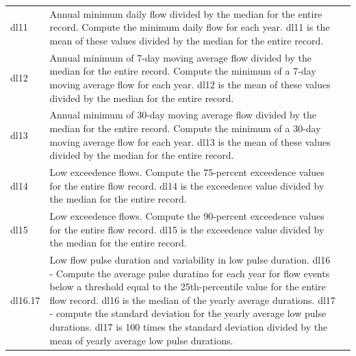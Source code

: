 \documentclass[a4paper,11pt]{article}\usepackage[]{graphicx}\usepackage[]{color}
\begin{document}
\begin{table}[ht]
\begin{threeparttable}[b]
\begin{tabularx}{\textwidth}{lXl}
  dl11 & Annual minimum daily flow divided by the median for the entire record. Compute the minimum daily flow for each year. dl11 is the mean of these values divided by the median for the entire record. \\
  dl12 & Annual minimum of 7-day moving average flow divided by the median for the entire record. Compute the minimum of a 7-day moving average flow for each year. dl12 is the mean of these values divided by the median for the entire record. \\
  dl13 & Annual minimum of 30-day moving average flow divided by the median for the entire record. Compute the minimum of a 30-day moving average flow for each year. dl13 is the mean of these values divided by the median for the entire record. \\
  dl14 & Low exceedence flows. Compute the 75-percent exceedence values for the entire flow record. dl14 is the exceedence value divided by the median for the entire record. \\
  dl15 & Low exceedence flows. Compute the 90-percent exceedence values for the entire flow record. dl15 is the exceedence value divided by the median for the entire record. \\
  dl16.17 & Low flow pulse duration and variability in low pulse duration. dl16 - Compute the average pulse duratino for each year for flow events below a threshold equal to the 25th-percentile value for the entire flow record. dl16 is the median of the yearly average durations. dl17 - compute the standard deviation for the yearly average low pulse durations. dl17 is 100 times the standard deviation divided by the mean of yearly average low pulse durations. \\
    \hline
  \end{tabularx}
  \end{threeparttable}
\end{table}
\end{document}
